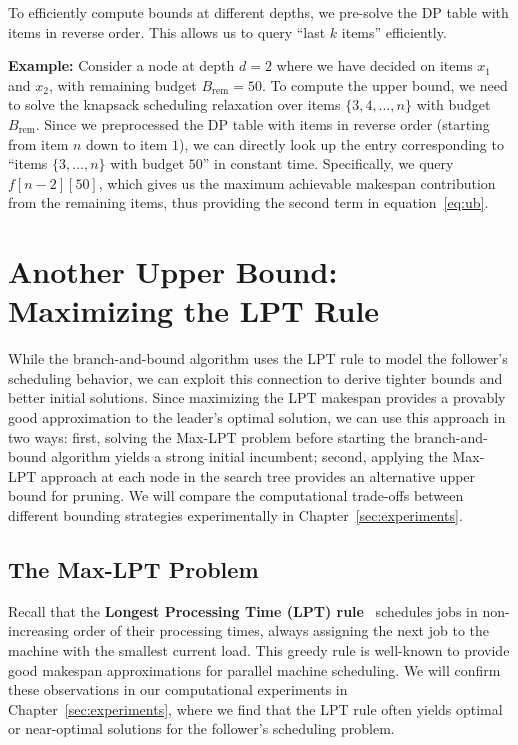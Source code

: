 To efficiently compute bounds at different depths, we pre-solve the DP table with items in reverse order. This allows us to query ``last $k$ items'' efficiently.

\textbf{Example:} Consider a node at depth $d=2$ where we have decided on items $x_1$ and $x_2$, with remaining budget $B_{\text{rem}} = 50$. To compute the upper bound, we need to solve the knapsack scheduling relaxation over items $\{3, 4, \ldots, n\}$ with budget $B_{\text{rem}}$. Since we preprocessed the DP table with items in reverse order (starting from item $n$ down to item $1$), we can directly look up the entry corresponding to ``items $\{3, \ldots, n\}$ with budget $50$'' in constant time. Specifically, we query $f[n-2][50]$, which gives us the maximum achievable makespan contribution from the remaining items, thus providing the second term in equation~\eqref{eq:ub}.

\section{Another Upper Bound: Maximizing the LPT Rule}
\label{sec:max-lpt-relaxation}

While the branch-and-bound algorithm uses the LPT rule to model the follower's scheduling behavior, we can exploit this connection to derive tighter bounds and better initial solutions. 
Since maximizing the LPT makespan provides a provably good approximation to the leader's optimal solution, we can use this approach in two ways: 
first, solving the Max-LPT problem before starting the branch-and-bound algorithm yields a strong initial incumbent;
 second, applying the Max-LPT approach at each node in the search tree provides an alternative upper bound for pruning.
  We will compare the computational trade-offs between different bounding strategies experimentally in Chapter~\ref{sec:experiments}.

\subsection{The Max-LPT Problem}

Recall that the \textbf{Longest Processing Time (LPT) rule}~\cite{graham1969bounds} schedules jobs in non-increasing order of their processing times, always assigning the next job to the machine with the smallest current load. 
This greedy rule is well-known to provide good makespan approximations for parallel machine scheduling. 
We will confirm these observations in our computational experiments in Chapter~\ref{sec:experiments}, where we find that the LPT rule often yields optimal or near-optimal solutions for the follower's scheduling problem.

